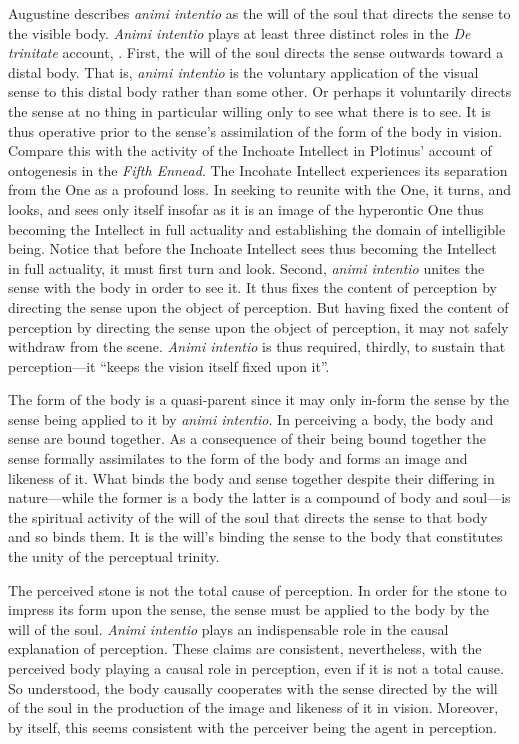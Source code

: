 \documentclass[12pt]{article}
\begin{document}
Augustine describes \emph{animi intentio} as the will of the soul that directs the sense to the visible body. \emph{Animi intentio} plays at least three distinct roles in the \emph{De trinitate} account, \citep[81--82]{Silva:2014bh}. First, the will of the soul directs the sense outwards toward a distal body. That is, \emph{animi intentio} is the voluntary application of the visual sense to this distal body rather than some other. Or perhaps it voluntarily directs the sense at no thing in particular willing only to see what there is to see. It is thus operative prior to the sense's assimilation of the form of the body in vision. Compare this with the activity of the Inchoate Intellect in Plotinus' account of ontogenesis in the \emph{Fifth Ennead}. The Incohate Intellect experiences its separation from the One as a profound loss. In seeking to reunite with the One, it turns, and looks, and sees only itself insofar as it is an image of the hyperontic One thus becoming the Intellect in full actuality and establishing the domain of intelligible being. Notice that before the Inchoate Intellect sees thus becoming the Intellect in full actuality, it must first turn and look. Second, \emph{animi intentio} unites the sense with the body in order to see it. It thus fixes the content of perception by directing the sense upon the object of perception. But having fixed the content of perception by directing the sense upon the object of perception, it may not safely withdraw from the scene. \emph{Animi intentio} is thus required, thirdly, to sustain that perception---it ``keeps the vision itself fixed upon it''. 

The form of the body is a quasi-parent since it may only in-form the sense by the sense being applied to it by \emph{animi intentio}. In perceiving a body, the body and sense are bound together. As a consequence of their being bound together the sense formally assimilates to the form of the body and forms an image and likeness of it. What binds the body and sense together despite their differing in nature---while the former is a body the latter is a compound of body and soul---is the spiritual activity of the will of the soul that directs the sense to that body and so binds them. It is the will's binding the sense to the body that constitutes the unity of the perceptual trinity.

The perceived stone is not the total cause of perception. In order for the stone to impress its form upon the sense, the sense must be applied to the body by the will of the soul. \emph{Animi intentio} plays an indispensable role in the causal explanation of perception. These claims are consistent, nevertheless, with the perceived body playing a causal role in perception, even if it is not a total cause. So understood, the body causally cooperates with the sense directed by the will of the soul in the production of the image and likeness of it in vision. Moreover, by itself, this seems consistent with the perceiver being the agent in perception. 
\end{document}
